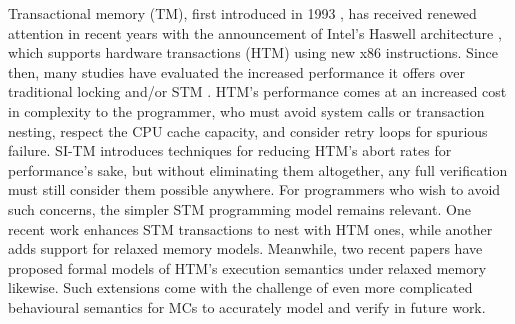 Transactional memory (TM), first introduced in 1993 \cite{transactional-memory},
has received renewed attention in recent years with the announcement of Intel's Haswell architecture \cite{htm-haswell},
which supports hardware transactions (HTM) using new x86 instructions.
Since then, many studies have evaluated the increased performance it offers over traditional locking and/or STM
\cite{htm-experience,htm-performance,tm-benchmark-cmu}.
%
HTM's performance comes at an increased cost in complexity to the programmer,
who must avoid system calls or transaction nesting, respect the CPU cache capacity,
and consider retry loops for spurious failure.
SI-TM \cite{si-tm} introduces techniques for reducing HTM's abort rates for performance's sake,
but without eliminating them altogether, any full verification must still consider them possible anywhere.
For programmers who wish to avoid such concerns,
the simpler STM programming model remains relevant.
One recent work \cite{hybrid-htm-stm} enhances STM transactions to nest with HTM ones,
while another \cite{stm-relaxed-memory} adds support for relaxed memory models.
Meanwhile, two recent papers \cite{relaxed-transactions-pldi,relaxed-transactions-popl}
have proposed formal models of HTM's execution semantics under relaxed memory likewise.
Such extensions come with the challenge of even more complicated behavioural semantics
for MCs to accurately model and verify in future work.

